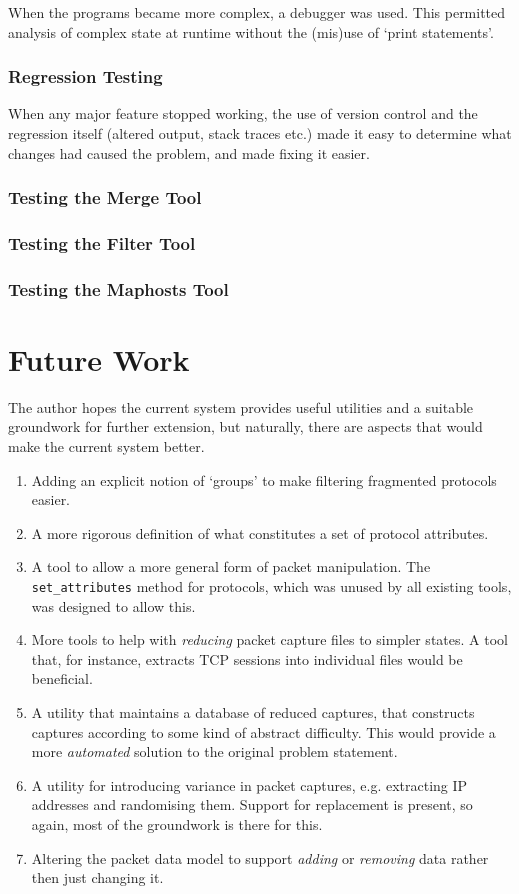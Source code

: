 \documentclass[10pt,a4paper,notitlepage,twoside]{report}
\begin{document}
When the programs became more complex, a debugger was used. This permitted analysis of complex state at runtime without the (mis)use of `print statements'.

\subsection{Regression Testing}
When any major feature stopped working, the use of version control and the regression itself (altered output, stack traces etc.) made it easy to determine what changes had caused the problem, and made fixing it easier.

\subsection{Testing the Merge Tool}
\subsection{Testing the Filter Tool}
\subsection{Testing the Maphosts Tool}

\chapter{Future Work}
The author hopes the current system provides useful utilities and a suitable groundwork for further extension, but naturally, there are aspects that would make the current system better.
\begin{enumerate}[label=\roman*)]
\item Adding an explicit notion of `groups' to make filtering fragmented protocols easier.
\item A more rigorous definition of what constitutes a set of protocol attributes.
\item A tool to allow a more general form of packet manipulation. The \texttt{set_attributes} method for protocols, which was unused by all existing tools, was designed to allow this.
\item More tools to help with \emph{reducing} packet capture files to simpler states. A tool that, for instance, extracts TCP sessions into individual files would be beneficial.
\item A utility that maintains a database of reduced captures, that constructs captures according to some kind of abstract difficulty. This would provide a more \emph{automated} solution to the original problem statement.
\item A utility for introducing variance in packet captures, e.g. extracting IP addresses and randomising them. Support for replacement is present, so again, most of the groundwork is there for this.
\item Altering the packet data model to support \emph{adding} or \emph{removing} data rather then just changing it.
\end{enumerate}
\end{document}
